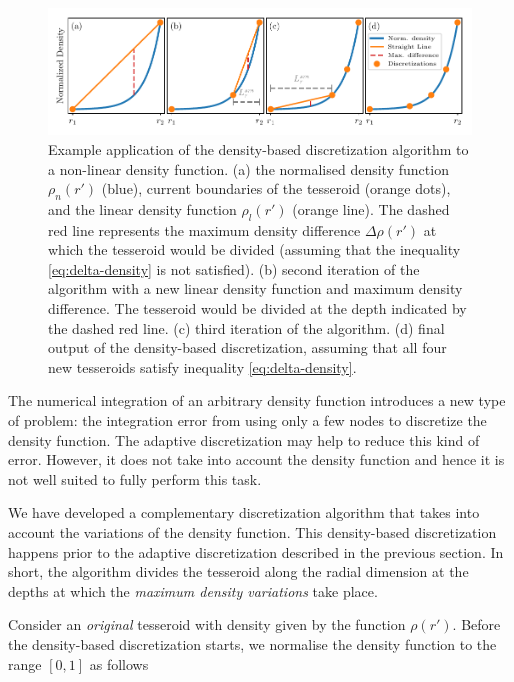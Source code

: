 \documentclass[extra, referee]{gji}
\begin{document}
\begin{figure}
\centering
\includegraphics[width=\linewidth]
    {figures/density-based-discretization-algorithm.pdf}
\caption{
    Example application of the density-based discretization algorithm to a non-linear
    density function.
    (a) the normalised density function $\rho_n(r')$ (blue), current boundaries of the
    tesseroid (orange dots), and the linear density function $\rho_l(r')$ (orange line).
    The dashed red line represents the maximum density difference $\Delta \rho (r')$ at
    which the tesseroid would be divided (assuming that the inequality
    \ref{eq:delta-density} is not satisfied).
    (b) second iteration of the algorithm with a new linear density function and maximum
    density difference. The tesseroid would be divided at the depth indicated by the
    dashed red line.
    (c) third iteration of the algorithm.
    (d) final output of the density-based discretization, assuming that all four new
    tesseroids satisfy inequality \ref{eq:delta-density}.
}
\label{fig:density-discretization-algorithm}
\end{figure}

The numerical integration of an arbitrary density function introduces
a new type of problem:
the integration error from using only a few nodes to discretize the density function.
The adaptive discretization may help
to reduce this kind of error.
However, it does not take into account the density function
and hence it is not well suited to fully perform this task.

We have developed a complementary discretization
algorithm that takes into account the variations of the density function.
This density-based discretization happens prior to the adaptive discretization described
in the previous section.
In short, the algorithm divides the tesseroid along the radial dimension at the
depths at which the \emph{maximum density variations} take place.

Consider an \emph{original} tesseroid with density given by the function $\rho(r')$.
Before the density-based discretization starts,
we normalise the density function to the range $[0, 1]$ as follows
\end{document}
